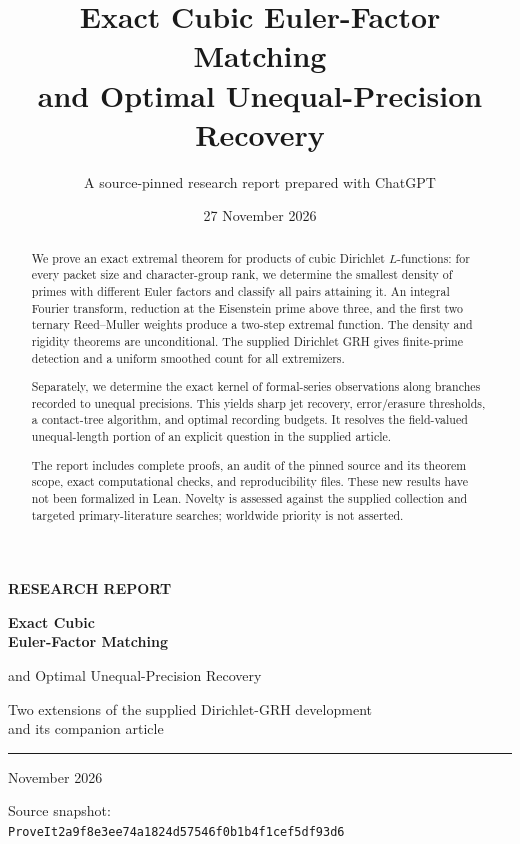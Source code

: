 \documentclass[11pt,a4paper]{article}
\title{Exact Cubic Euler-Factor Matching\\[4pt]
and Optimal Unequal-Precision Recovery}
\author{A source-pinned research report prepared with ChatGPT}
\date{27 November 2026}
\begin{document}
\hypersetup{pageanchor=false}
\begin{titlepage}
\thispagestyle{empty}
{\color{accent}\sffamily\bfseries RESEARCH REPORT\par}
\vspace{1.5cm}
{\sffamily\bfseries\fontsize{27}{33}\selectfont
Exact Cubic\\Euler-Factor Matching\par}
\vspace{0.5cm}
{\sffamily\fontsize{22}{28}\selectfont
and Optimal Unequal-Precision Recovery\par}
\vspace{0.8cm}
{\large Two extensions of the supplied Dirichlet-GRH development\\
and its companion article\par}
\vspace{1cm}
\hrule
\vspace{0.65cm}
\begin{abstract}
We prove an exact extremal theorem for products of cubic Dirichlet
$L$-functions: for every packet size and character-group rank, we determine
the smallest density of primes with different Euler factors and classify
all pairs attaining it. An integral Fourier transform, reduction at the
Eisenstein prime above three, and the first two ternary Reed--Muller
weights produce a two-step extremal function. The density and rigidity
theorems are unconditional. The supplied Dirichlet GRH gives finite-prime
detection and a uniform smoothed count for all extremizers.

Separately, we determine the exact kernel of formal-series observations
along branches recorded to unequal precisions. This yields sharp jet
recovery, error/erasure thresholds, a contact-tree algorithm, and optimal
recording budgets. It resolves the field-valued unequal-length portion
of an explicit question in the supplied article.

The report includes complete proofs, an audit of the pinned source and
its theorem scope, exact computational checks, and reproducibility files.
These new results have not been formalized in Lean. Novelty is assessed
against the supplied collection and targeted primary-literature searches;
worldwide priority is not asserted.
\end{abstract}
\vfill
{ November 2026\par}
\medskip
{\small Source snapshot:\\
\texttt{ProveIt}\quad\texttt{2a9f8e3ee74a1824d57546f0b1b4f1cef5df93d6}\par}
\end{titlepage}
\end{document}
